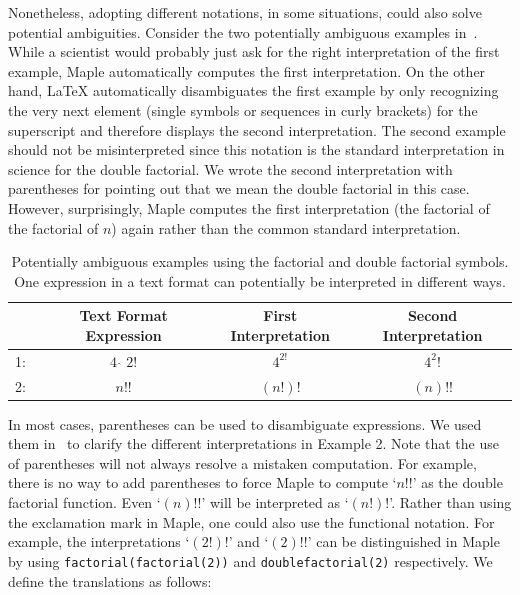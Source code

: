 \documentclass[a4paper,11pt]{article}
\newcommand{\Maple}{Maple}
\theoremstyle{defTheoStyle}
\theoremstyle{defExampStyle}
\begin{document}
	Nonetheless, adopting different notations, in some situations, could also solve potential ambiguities. Consider the two potentially ambiguous examples in~. While a scientist would probably just ask for the right interpretation of the first example, \Maple{} automatically computes the first interpretation. On the other hand, \LaTeX{} automatically disambiguates the first example by only recognizing the very next element (single symbols or sequences in curly brackets) for the superscript and therefore displays the second interpretation. The second example should not be misinterpreted since this notation is the standard interpretation in science for the double factorial. We wrote the second interpretation with parentheses for pointing out that we mean the double factorial in this case. However, surprisingly, \Maple{} computes the first interpretation (the factorial of the factorial of $n$) again rather than the common standard interpretation.
	\begin{table}[ht]
		\centering
		\begin{tabular}{lccc}
			\hline
			& Text Format Expression & First Interpretation & Second Interpretation\\
			\hline
			1:~& \rule{0pt}{0.9\normalbaselineskip} $4\ \hat{\ }\ 2!$ & $4^{2!}$ & $4^2!$ \\
			2:~& $n!!$ & $(n!)!$ & $(n)!!$\\
			\hline
		\end{tabular}
		\caption{Potentially ambiguous examples using the factorial and double factorial symbols. One expression in a text format can potentially be interpreted in different ways.}
		\label{tab:amb_ex}
	\end{table}
	\vspace*{-0.5cm}
	
	In most cases, parentheses can be used to disambiguate expressions. We used them in~ to clarify the different interpretations in Example 2. Note that the use of parentheses will not always resolve a mistaken computation. For example, there is no way to add parentheses to force \Maple{} to compute `$n!!$' as the double factorial function. Even `$(n)!!$' will be interpreted as `$(n!)!$'. Rather than using the exclamation mark in \Maple, one could also use the functional notation. For example, the interpretations `$(2!)!$' and `$(2)!!$' can be distinguished in \Maple{} by using \verb|factorial(factorial(2))| and \verb|doublefactorial(2)| respectively. We define the translations as follows:
	
\end{document}
